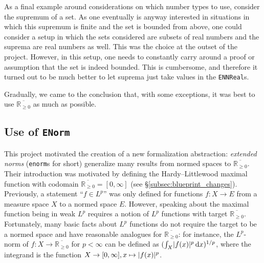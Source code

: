 \documentclass[12pt]{amsart}
\newcommand{\lean}[1]{\lstinline{#1}}
\DeclarePairedDelimiter{\abs}{\lvert}{\rvert}
\newcommand*{\ud}{\, \mathrm{d}}
\newcommand*{\real}{\mathbb{R}} %
\newcommand{\ennreal}{\overline{\real_{\ge0}}}
\theoremstyle{definition}
\theoremstyle{plain}
\begin{document}
As a final example around considerations on which number types to use, consider the supremum of a set.
As one eventually is anyway interested in situations in which this supremum is finite and the set
is bounded from above, one could consider a setup in which the sets considered are subsets of
real numbers and the suprema are real numbers as well.
This was the choice at the outset of the project.
However, in this setup, one needs to constantly carry around a proof or assumption that the
set is indeed bounded.
This is cumbersome, and therefore it turned out to be much better to
let suprema just take values in the \texttt{ENNReal}s.

Gradually, we came to the conclusion that, with some exceptions, it was best to use $\ennreal$ as much as possible.

\subsection{Use of \texttt{ENorm}}\label{subsec:enorm}

This project motivated the creation of a new formalization abstraction: \emph{extended norms} (\lean{enorm}s for short) generalize many results from normed spaces to $\ennreal$.
Their introduction was motivated by defining the Hardy--Littlewood maximal function with codomain $\ennreal=[0,\infty]$ (see \S\ref{subsec:blueprint_changes}).
Previously, a statement ``$f\in L^p$'' was only defined for functions $f\colon X\to E$ from a measure space $X$ to a normed space $E$. However, speaking about the maximal function being in weak $L^p$ requires a notion of $L^p$ functions with target $\ennreal$. Fortunately, many basic facts about $L^p$ functions do not require the target to be a normed space and have reasonable analogues for $\ennreal$: for instance, the $L^p$-norm of $f\colon X\to\ennreal$ for $p<\infty$ can be defined as $(\int_X \abs{f(x)}^p \ud x)^{1/p}$, where the integrand is the function $X\to[0,\infty], x\mapsto \abs{f(x)}^p$.
\end{document}
